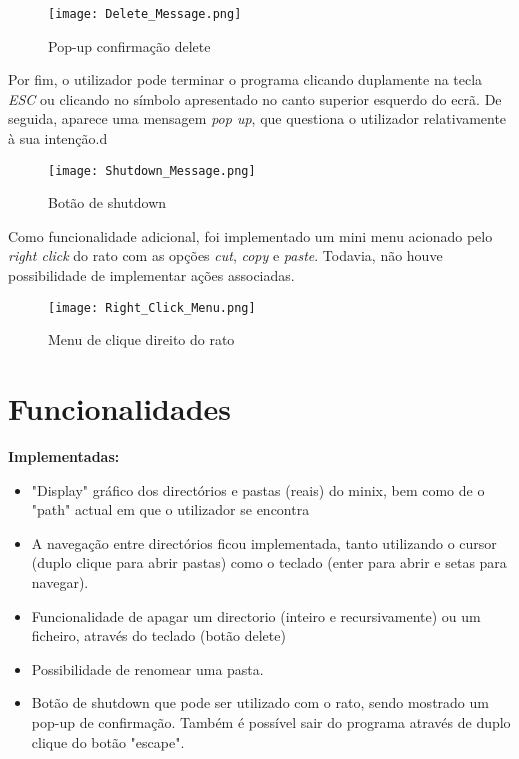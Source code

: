 \documentclass[a4paper]{article}
\begin{document}
	
	\begin{figure}[h]
\centering
\texttt{[image: Delete\_Message.png]}
\caption{Pop-up confirmação delete}
\end{figure}


	Por fim, o utilizador pode terminar o programa clicando duplamente na tecla \textit{ESC} ou clicando no símbolo apresentado no canto superior esquerdo do ecrã. De seguida, aparece uma mensagem \textit{pop up}, que questiona o utilizador relativamente à sua intenção.d


	
	\begin{figure}[h]
\centering
\texttt{[image: Shutdown\_Message.png]}
\caption{Botão de shutdown}
\end{figure}

Como funcionalidade adicional, foi implementado um mini menu acionado pelo \textit{right click} do rato com as opções \textit{cut}, \textit{copy} e \textit{paste}. Todavia, não houve possibilidade de implementar ações associadas.
	
\begin{figure}[h]
\centering
\texttt{[image: Right\_Click\_Menu.png]}
\caption{Menu de clique direito do rato}
\end{figure}
\FloatBarrier
\newpage
\section{Funcionalidades}

\textbf { Implementadas:}

\begin{itemize}

    \item "Display" gráfico dos directórios e pastas (reais) do minix, bem como de o "path" actual em que o utilizador se encontra

	\item A navegação entre directórios ficou implementada, tanto utilizando o cursor (duplo clique para abrir pastas) como o teclado (enter para abrir e setas para navegar).
	
	\item Funcionalidade de apagar um directorio (inteiro e recursivamente) ou um ficheiro, através do teclado (botão delete)

	\item Possibilidade de renomear uma pasta. 
	
	\item Botão de shutdown que pode ser utilizado com o rato, sendo mostrado um pop-up de confirmação. Também é possível sair do programa através de duplo clique do botão "escape".

\end{itemize}
\end{document}
